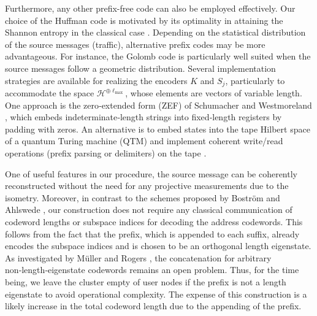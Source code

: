 \documentclass[conference]{IEEEtran}
\begin{document}
Furthermore, any other prefix-free code can also be employed effectively. Our choice of the Huffman code is motivated by its optimality in attaining the Shannon entropy in the classical case \cite{gersho2012vector}. Depending on the statistical distribution of the source messages (traffic), alternative prefix codes may be more advantageous. For instance, the Golomb code is particularly well suited when the source messages follow a geometric distribution. Several implementation strategies are available for realizing the encoders $K$ and $S_j$, particularly to accommodate the space $\mathcal{H}^{\oplus\ell_{\mathrm{max}}}$, whose elements are vectors of variable length. One approach is the zero‑extended form (ZEF) of Schumacher and Westmoreland \cite{SchumacherWestmoreland2001}, which embeds indeterminate‑length strings into fixed‑length registers by padding with zeros. An alternative is to embed states into the tape Hilbert space of a quantum Turing machine (QTM) and implement coherent write/read operations (prefix parsing or delimiters) on the tape \cite{Mller2008QuantumBS}.

One of useful features in our procedure, the source message can be coherently reconstructed without the need for any projective measurements due to the isometry. Moreover, in contrast to the schemes proposed by Boström \cite{PhysRevA.65.032313} and Ahlswede \cite{ahlswede2003lossless}, our construction does not require any classical communication of codeword lengths or subspace indices for decoding the address codewords. This follows from the fact that the prefix, which is appended to each suffix, already encodes the subspace indices and is chosen to be an orthogonal length eigenstate. As investigated by Müller and Rogers \cite{Mller2008QuantumBS}, the concatenation for arbitrary non‑length‑eigenstate codewords remains an open problem. Thus, for the time being, we leave the cluster empty of user nodes if the prefix is not a length eigenstate to avoid operational complexity. The expense of this construction is a likely increase in the total codeword length due to the appending of the prefix.

\end{document}
